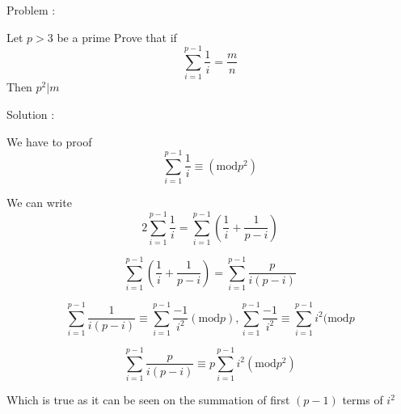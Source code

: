 Problem : 

Let $p > 3$ be a prime Prove that if \[ \sum_{i=1}^{p-1} \frac{1}{i} = \frac{m}{n} \]
Then $p^2|m$

Solution :

We have to proof \[ \sum_{i=1}^{p-1} \frac{1}{i} \equiv ( \text{mod} p^2 ) \]

We can write \[ 2 \sum_{i=1}^{p-1} \frac{1}{i} =  \sum_{i=1}^{p-1} ( \frac{1}{i} + \frac{1}{p-i} ) \] 

\[ \sum_{i=1}^{p-1} ( \frac{1}{i} + \frac{1}{p-i}) = \sum_{i=1}^{p-1}  \frac{p}{i(p-i)} \]

 \[ \sum_{i=1}^{p-1} \frac{1}{i(p-i)} \equiv \sum_{i=1}^{p-1} \frac{-1}{i^2} ( \text{mod} p)  ,  \sum_{i=1}^{p-1} \frac{-1}{i^2} \equiv  \sum_{i=1}^{p-1}i^2 ( \text{mod} p \] 
 
 \[ \sum_{i=1}^{p-1} \frac{p}{i(p-i)} \equiv p \sum_{i=1}^{p-1} i^2  ( \text{mod} p^2) \]
 
 Which is true as it can be seen on the summation of first $(p-1)$ terms of  $i^2$

